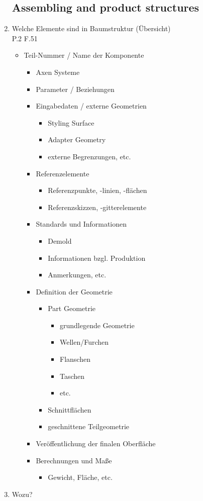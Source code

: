 \documentclass[10pt,a4paper,fleqn]{article}
\begin{document}
\begin{enumerate}
\subsection{Assembling and product structures}
	\item Welche Elemente sind in Baumstruktur (Übersicht)\\
		P.2 F.51
		\begin{itemize}
			\item Teil-Nummer / Name der Komponente
				\begin{itemize}
					\item Axen Systeme
					\item Parameter / Beziehungen
					\item Eingabedaten / externe Geometrien
						\begin{itemize}
							\item Styling Surface
							\item Adapter Geometry
							\item externe Begrenzungen, etc.
						\end{itemize}
					\item Referenzelemente
						\begin{itemize}
							\item Referenzpunkte, -linien, -flächen
							\item Referenzskizzen, -gitterelemente
						\end{itemize}
					\item Standards und Informationen
						\begin{itemize}
							\item Demold
							\item Informationen bzgl. Produktion
							\item Anmerkungen, etc.
						\end{itemize}
					\item Definition der Geometrie
						\begin{itemize}
							\item Part Geometrie
								\begin{itemize}
									\item grundlegende Geometrie
									\item Wellen/Furchen
									\item Flanschen
									\item Taschen
									\item etc.
								\end{itemize}
							\item Schnittflächen
							\item geschnittene Teilgeometrie
						\end{itemize}
					\item Veröffentlichung der finalen Oberfläche
					\item Berechnungen und Maße
						\begin{itemize}
							\item Gewicht, Fläche, etc.
						\end{itemize}
				\end{itemize}
		\end{itemize}
	\item Wozu?

\end{enumerate}
\end{document}
